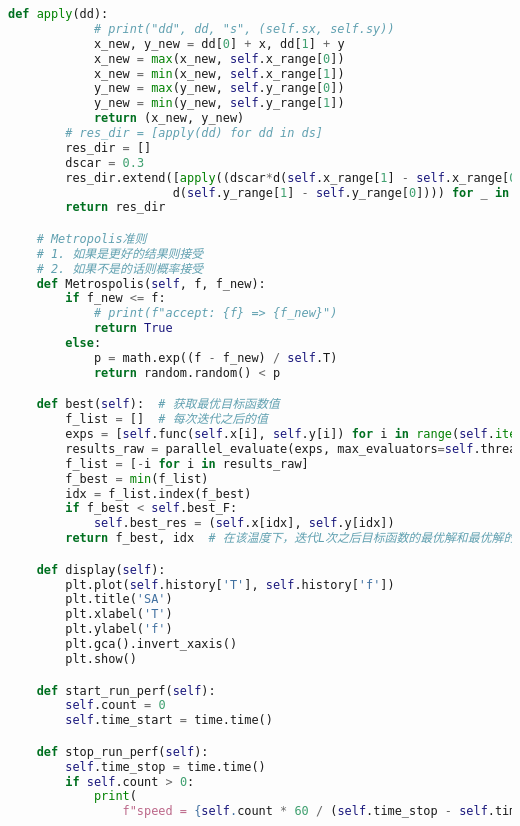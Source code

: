 \begin{lstlisting}[language=Python,breaklines=true]
        def apply(dd):
            # print("dd", dd, "s", (self.sx, self.sy))
            x_new, y_new = dd[0] + x, dd[1] + y
            x_new = max(x_new, self.x_range[0])
            x_new = min(x_new, self.x_range[1])
            y_new = max(y_new, self.y_range[0])
            y_new = min(y_new, self.y_range[1])
            return (x_new, y_new)
        # res_dir = [apply(dd) for dd in ds]
        res_dir = []
        dscar = 0.3
        res_dir.extend([apply((dscar*d(self.x_range[1] - self.x_range[0]), dscar *
                       d(self.y_range[1] - self.y_range[0]))) for _ in range(thread_num-len(res_dir))])
        return res_dir

    # Metropolis准则
    # 1. 如果是更好的结果则接受
    # 2. 如果不是的话则概率接受
    def Metrospolis(self, f, f_new):
        if f_new <= f:
            # print(f"accept: {f} => {f_new}")
            return True
        else:
            p = math.exp((f - f_new) / self.T)
            return random.random() < p

    def best(self):  # 获取最优目标函数值
        f_list = []  # 每次迭代之后的值
        exps = [self.func(self.x[i], self.y[i]) for i in range(self.iter)]
        results_raw = parallel_evaluate(exps, max_evaluators=self.thread_num)
        f_list = [-i for i in results_raw]
        f_best = min(f_list)
        idx = f_list.index(f_best)
        if f_best < self.best_F:
            self.best_res = (self.x[idx], self.y[idx])
        return f_best, idx  # 在该温度下，迭代L次之后目标函数的最优解和最优解的下标

    def display(self):
        plt.plot(self.history['T'], self.history['f'])
        plt.title('SA')
        plt.xlabel('T')
        plt.ylabel('f')
        plt.gca().invert_xaxis()
        plt.show()

    def start_run_perf(self):
        self.count = 0
        self.time_start = time.time()

    def stop_run_perf(self):
        self.time_stop = time.time()
        if self.count > 0:
            print(
                f"speed = {self.count * 60 / (self.time_stop - self.time_start)} it/min, duration = {self.time_stop - self.time_start}, count = {self.count}")


\end{lstlisting}

